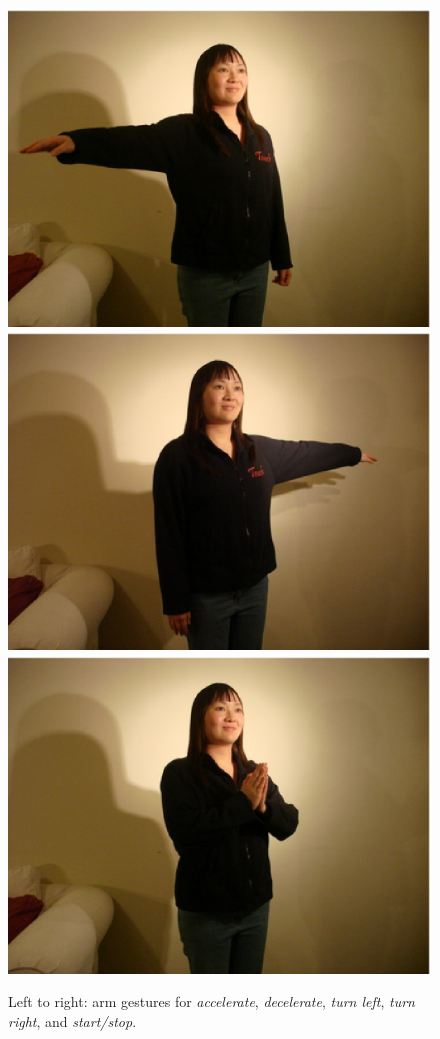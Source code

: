 \documentclass[12pt,a4,notitlepage]{report}
\renewcommand{\_}{\texttt{\symbol{95}}}
\newcommand{\<}{\texttt{\symbol{60}}}
\renewcommand{\>}{\texttt{\symbol{62}}}
\begin{document}
\begin{figure}
\includegraphics[scale=0.3,angle=0]{images/left.ps}
\includegraphics[scale=0.3,angle=0]{images/right.ps}
\includegraphics[scale=0.3,angle=0]{images/startstop.ps}
\caption{Left to right: arm gestures for \textit{accelerate}, \textit{decelerate}, \textit{turn left}, \textit{turn right}, and \textit{start/stop}.}
\label{gestures}
\end{figure}
\end{document}
